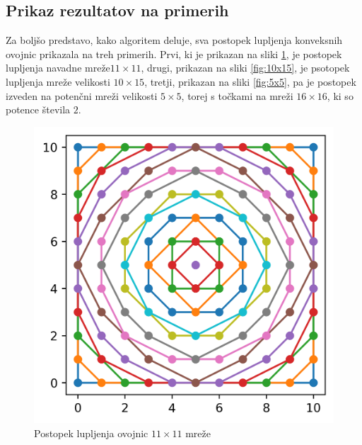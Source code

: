 \documentclass[a4paper]{article}
\begin{document}
\newpage
\subsection{Prikaz rezultatov na primerih}
Za boljšo predstavo, kako algoritem deluje, sva postopek lupljenja konveksnih ovojnic prikazala na treh primerih. Prvi, ki je prikazan na sliki \ref{fig:11x11}, je postopek lupljenja 
navadne mreže$11 \times 11$, drugi, prikazan na sliki \ref{fig:10x15}, je psotopek lupljenja mreže velikosti $10 \times 15$, tretji, prikazan na sliki \ref{fig:5x5}, pa je postopek 
izveden na potenčni mreži velikosti $5 \times 5$, torej s točkami na mreži $16 \times 16$, ki so potence števila $2$.

\begin{figure}[!h]
	\centering
	\caption{Postopek lupljenja ovojnic $11 \times 11$ mreže}
	\label{fig:11x11}
	\vspace{2mm}
	\includegraphics[scale=0.5]{11x11_enakomerna.png}
\end{figure}
\end{document}
